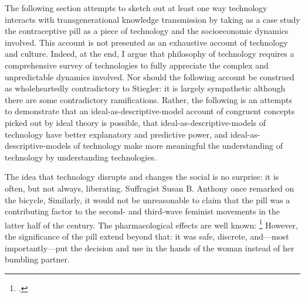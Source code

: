 \documentclass[letterpaper,notitlepage,12pt]{article}
\begin{document}
The following section attempts to sketch out at least one way technology
interacts with transgenerational knowledge transmission by taking as a case
study the contraceptive pill as a piece of technology and the socioeconomic
dynamics involved. This account is not presented as an exhaustive account of
technology and culture.
Indeed, at the end, I argue that philosophy of technology requires a
comprehensive survey of technologies to fully appreciate the complex and
unpredictable dynamics involved. Nor should the following account be construed
as wholeheartedly contradictory to Stiegler: it is largely sympathetic although
there are some contradictory ramifications.
Rather, the following is an attempts to demonstrate that an
ideal-as-descriptive-model account of congruent concepts picked out by ideal
theory is possible, that ideal-as-descriptive-models of technology have better
explanatory and predictive power, and ideal-as-descriptive-models of technology
make more meaningful the understanding of technology by understanding
technologies.

The idea that technology disrupts and changes the social is no surprise: it is
often, but not always, liberating.
Suffragist Susan B. Anthony once remarked on the bicycle, 
Similarly, it would not be unreasonable to claim that the pill was a
contributing factor to the second- and third-wave feminist movements in the
latter half of the  century. The pharmacological effects are well known:
\footcite[p.
731]{goldin_power_2002} However, the significance of the pill extend beyond that:
it was safe, discrete, and---most importantly---put the decision and use in the 
hands of the woman instead of her bumbling partner.
\end{document}
